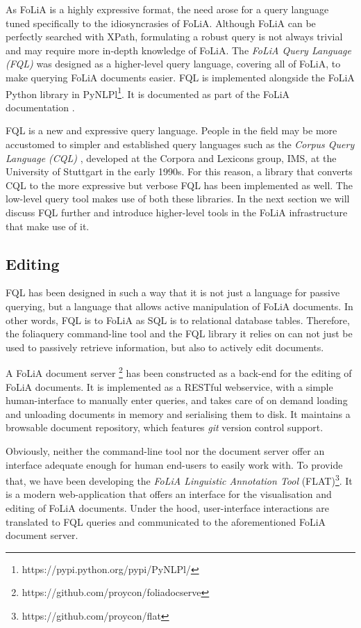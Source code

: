 \documentclass[a4paper,10pt,twoside]{article}
\begin{document}
As FoLiA is a highly expressive format, the need arose for a query language
tuned specifically to the idiosyncrasies of FoLiA. Although FoLiA can be
perfectly searched with XPath, formulating a robust query is not always trivial
and may require more in-depth knowledge of FoLiA. The \emph{FoLiA Query
Language (FQL)} was designed as a higher-level query language, covering all of
FoLiA, to make querying FoLiA documents easier. FQL is implemented alongside
the FoLiA Python library in
PyNLPl\footnote{https://pypi.python.org/pypi/PyNLPl/}. It is documented as part
of the FoLiA documentation \cite{FOLIADOC2014}.

FQL is a new and expressive query language. People in the field may be more
accustomed to simpler and established query languages such as the \emph{Corpus
Query Language (CQL)} \cite{CQL}, developed at the Corpora and Lexicons group,
IMS, at the University of Stuttgart in the early 1990s. For this reason, a
library that converts CQL to the more expressive but verbose FQL has been
implemented as well. The low-level query tool makes use of both these libraries. In the
next section we will discuss FQL further and introduce higher-level tools in
the FoLiA infrastructure that make use of it.

\subsection{Editing}

FQL has been designed in such a way that it is not just a language for passive
querying, but a language that allows active manipulation of FoLiA documents. In
other words, FQL is to FoLiA as SQL is to relational database tables.
Therefore, the foliaquery command-line tool and the FQL library it relies on
can not just be used to passively retrieve information, but also to actively
edit documents.

A FoLiA document server \footnote{https://github.com/proycon/foliadocserve} has
been constructed as a back-end for the editing of FoLiA documents. It is
implemented as a RESTful webservice, with a simple human-interface to manually
enter queries, and takes care of on demand loading and unloading documents in
memory and serialising them to disk. It maintains a browsable document
repository, which features \emph{git} version control support.

Obviously, neither the command-line tool nor the document server offer an
interface adequate enough for human end-users to easily work with. To provide
that, we have been developing the \emph{FoLiA Linguistic Annotation Tool}
(FLAT)\footnote{https://github.com/proycon/flat}. It is a modern
web-application that offers an interface for the visualisation and editing of
FoLiA documents. Under the hood, user-interface interactions are translated to FQL
queries and communicated to the aforementioned FoLiA document server.
\end{document}
